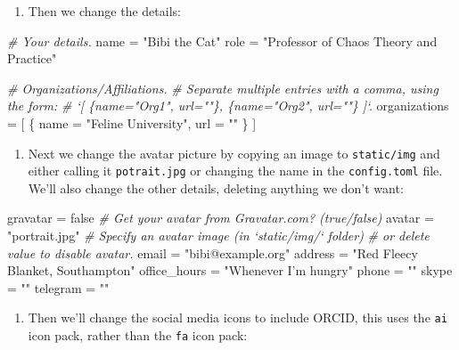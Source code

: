 \documentclass[12pt,]{book}
\newenvironment{Shaded}{\begin{snugshade}}{\end{snugshade}}
\newcommand{\StringTok}[1]{\textcolor[rgb]{0.31,0.60,0.02}{#1}}
\newcommand{\CommentTok}[1]{\textcolor[rgb]{0.56,0.35,0.01}{\textit{#1}}}
\newcommand{\NormalTok}[1]{#1}
\providecommand{\tightlist}{%
  \setlength{\itemsep}{0pt}\setlength{\parskip}{0pt}}
\theoremstyle{definition}
\theoremstyle{definition}
\theoremstyle{definition}
\theoremstyle{remark}
\begin{document}
\begin{enumerate}
\def\labelenumi{\arabic{enumi}.}
\setcounter{enumi}{1}
\tightlist
\item
  Then we change the details:
\end{enumerate}

\begin{Shaded}
\begin{Highlighting}[]
  \CommentTok{# Your details.}
\NormalTok{  name =}\StringTok{ "Bibi the Cat"}
\NormalTok{  role =}\StringTok{ "Professor of Chaos Theory and Practice"}
  
  \CommentTok{# Organizations/Affiliations.}
  \CommentTok{#   Separate multiple entries with a comma, using the form: }
  \CommentTok{# `[ \{name="Org1", url=""\}, \{name="Org2", url=""\} ]`.}
\NormalTok{  organizations =}\StringTok{ }\NormalTok{[ \{ name =}\StringTok{ "Feline University"}\NormalTok{, url =}\StringTok{ ""}\NormalTok{ \} ]}
\end{Highlighting}
\end{Shaded}

\begin{enumerate}
\def\labelenumi{\arabic{enumi}.}
\setcounter{enumi}{2}
\tightlist
\item
  Next we change the avatar picture by copying an image to
  \texttt{static/img} and either calling it \texttt{potrait.jpg} or
  changing the name in the \texttt{config.toml} file. We'll also change
  the other details, deleting anything we don't want:
\end{enumerate}

\begin{Shaded}
\begin{Highlighting}[]
\NormalTok{  gravatar =}\StringTok{ }\NormalTok{false  }\CommentTok{# Get your avatar from Gravatar.com? (true/false)}
\NormalTok{  avatar =}\StringTok{ "portrait.jpg"}  \CommentTok{# Specify an avatar image (in `static/img/` folder) }
                           \CommentTok{# or delete value to disable avatar.}
\NormalTok{  email =}\StringTok{ "bibi@example.org"}
\NormalTok{  address =}\StringTok{ "Red Fleecy Blanket, Southampton"}
\NormalTok{  office_hours =}\StringTok{ "Whenever I'm hungry"}
\NormalTok{  phone =}\StringTok{ ""}
\NormalTok{  skype =}\StringTok{ ""}
\NormalTok{  telegram =}\StringTok{ ""}
\end{Highlighting}
\end{Shaded}

\begin{enumerate}
\def\labelenumi{\arabic{enumi}.}
\setcounter{enumi}{3}
\tightlist
\item
  Then we'll change the social media icons to include ORCID, this uses
  the \texttt{ai} icon pack, rather than the \texttt{fa} icon pack:
\end{enumerate}
\end{document}

